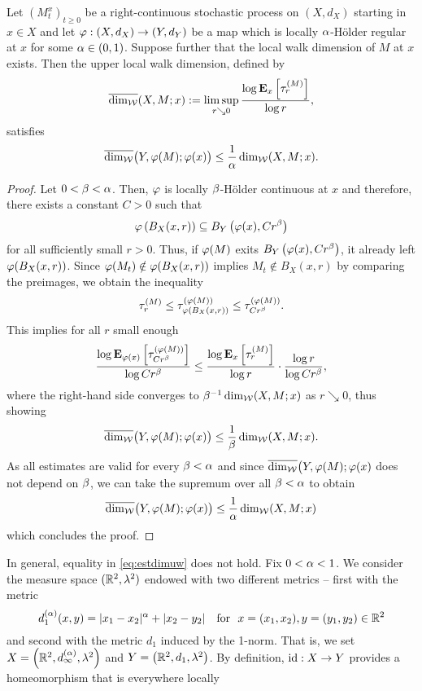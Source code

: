 \begin{lem}\label{lem:dimuw1}
  Let $\left(M_t^x\right)_{t\geq0}$ be a right-continuous stochastic process on $(X,d_X)$ starting in $x\in X$ and let $\gp:(X,d_X)\to(Y,d_Y)$ be a map which is locally $\ga$-H\"older regular at $x$ for some $\ga\in(0,1)$. Suppose further that the local walk dimension of $M$ at $x$ exists. Then the upper local walk dimension, defined by
  \[
    \dimuw(X,M;x):=\limsup_{r\searrow0}
       \frac{\log\PTEp{\tau_r^{(M)}}{x}}{\log r},
  \]
  satisfies 
  \begin{equation}\label{eq:estdimuw}
    \dimuw\big(Y,\gp(M);\gp(x)\big)
      \leq\frac{1}{\ga}\dimw(X,M;x).
  \end{equation}
\end{lem}
\begin{proof}
  Let $0<\gb<\ga$. Then, $\gp$ is locally $\gb$-H\"older continuous at $x$ and therefore, there exists a constant $C>0$ such that 
  \[
    \gp\left(B_X(x,r)\right)\ssq B_Y\left(\gp(x),Cr^\gb\right) 
  \]
  for all sufficiently small $r>0$. Thus, if $\gp(M)$ exits 
  $B_Y\left(\gp(x),Cr^\gb\right)$, it already left $\gp(B_X(x,r))$.
  Since $\gp(M_t)\notin\gp(B_X(x,r))$ implies $M_t\notin B_X(x,r)$ by comparing the preimages, we obtain the inequality
  \[
    \tau_r^{(M)}
    \leq \tau_{\gp(B_X(x,r))}^{(\gp(M))}
    \leq \tau_{Cr^\gb}^{(\gp(M))}.
  \]
  This implies for all $r$ small enough
  \[
    \frac{\log\PTEp{\tau_{Cr^\gb}^{(\gp(M))}}{\gp(x)}}{\log Cr^\gb}
    \leq \frac{\log\PTEp{\tau_r^{(M)}}{x}}{\log r}
      \cdot \frac{\log r}{\log Cr^\gb},
  \]
  where the right-hand side converges to $\gb^{-1}\dimw(X,M;x)$ as $r\searrow0$, thus showing
  \[
    \dimuw\big(Y,\gp(M);\gp(x)\big)\leq \frac{1}{\gb}\dimw(X,M;x).
  \]
  As all estimates are valid for every $\gb<\ga$ and since
  $\dimuw\big(Y,\gp(M);\gp(x)$ does not depend on $\gb$, we can take the supremum over all $\gb<\ga$ to obtain
  \[
    \dimuw\big(Y,\gp(M);\gp(x)\big)\leq \frac{1}{\ga}\dimw(X,M;x)
  \]
  which concludes the proof.
\end{proof}
In general, equality in \eqref{eq:estdimuw} does not hold. Fix $0<\ga<1$. We consider the measure space $(\IR^2,\gl^2)$ endowed with two different metrics -- first with the metric 
\[
  d_1^{(\ga)}(x,y)=|x_1-x_2|^\ga+|x_2-y_2|
  \ \ \text{ for }\ x=(x_1,x_2),y=(y_1,y_2)\in\IR^2
\]
and second with the metric $d_1$ induced by the 1-norm. That is, we set $X=\left(\IR^2,d_\infty^{(\ga)},\gl^2\right)$ and 
$Y=\left(\IR^2,d_1,\gl^2\right)$. By definition, 
$\id:X\to Y$ provides a homeomorphism that is everywhere locally 
